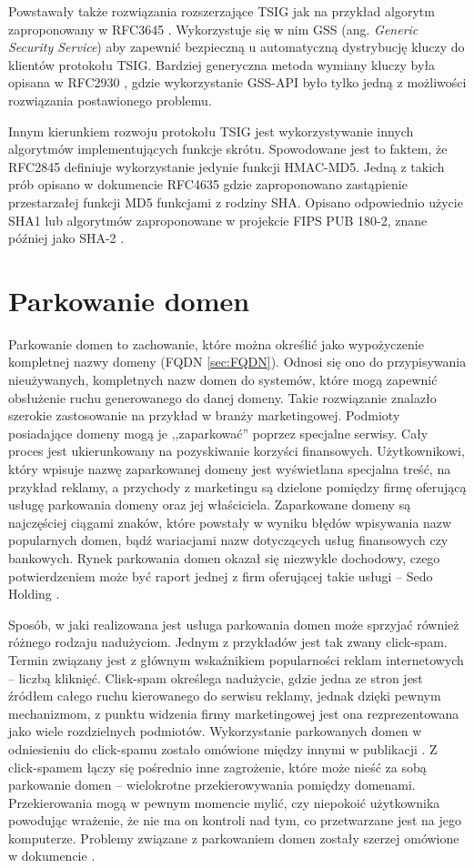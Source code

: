Powstawały także rozwiązania rozszerzające TSIG jak na przykład algorytm zaproponowany w RFC3645 \cite{RFC3645}. Wykorzystuje się
w nim GSS \cite{RFC2743}(ang. \textit{Generic Security Service}) aby zapewnić bezpieczną u automatyczną dystrybucję kluczy do
klientów protokołu TSIG. Bardziej generyczna metoda wymiany kluczy była opisana w RFC2930 \cite{RFC2930}, gdzie wykorzystanie
GSS-API było tylko jedną z możliwości rozwiązania postawionego problemu.

Innym kierunkiem rozwoju protokołu TSIG jest wykorzystywanie innych algorytmów implementujących funkcje skrótu. Spowodowane
jest to faktem, że RFC2845 \cite{RFC2845} definiuje wykorzystanie jedynie funkcji HMAC-MD5. Jedną z takich prób opisano w
dokumencie RFC4635 \cite{RFC4635} gdzie zaproponowano zastąpienie przestarzałej funkcji MD5 funkcjami z rodziny SHA. Opisano
odpowiednio użycie SHA1 \cite{RFC3174} lub algorytmów zaproponowane w projekcie FIPS PUB 180-2, znane później jako SHA-2 \cite{RFC4634}.

\section{Parkowanie domen}
Parkowanie domen to zachowanie, które można określić jako wypożyczenie kompletnej nazwy domeny (FQDN \ref{sec:FQDN}).
Odnosi się ono do przypisywania nieużywanych, kompletnych nazw domen do systemów, które mogą zapewnić obsłużenie ruchu generowanego
do danej domeny. Takie rozwiązanie znalazło szerokie zastosowanie na przykład w branży marketingowej. Podmioty posiadające domeny mogą
je ,,zaparkować'' poprzez specjalne serwisy. Cały proces jest ukierunkowany na pozyskiwanie korzyści finansowych. Użytkownikowi,
który wpisuje nazwę zaparkowanej domeny jest wyświetlana specjalna treść, na przykład reklamy, a przychody z marketingu są dzielone
pomiędzy firmę oferującą usługę parkowania domeny oraz jej właściciela. Zaparkowane domeny są najczęściej ciągami znaków, które
powstały w wyniku błędów wpisywania nazw popularnych domen, bądź wariacjami nazw dotyczących usług finansowych czy bankowych.
Rynek parkowania domen okazał się niezwykle dochodowy, czego potwierdzeniem może być raport jednej z firm oferującej
takie usługi -- Sedo Holding \cite{sedo}.

Sposób, w jaki realizowana jest usługa parkowania domen może sprzyjać również różnego rodzaju nadużyciom. Jednym z przykładów jest tak
zwany click-spam. Termin związany jest z głównym wskaźnikiem popularności reklam internetowych -- liczbą kliknięć. Clisk-spam określega
nadużycie, gdzie jedna ze stron jest źródłem całego ruchu kierowanego do serwisu reklamy, jednak dzięki pewnym mechanizmom, z punktu
widzenia firmy marketingowej jest ona rezprezentowana jako wiele rozdzielnych podmiotów. Wykorzystanie parkowanych domen w odniesieniu
do click-spamu zostało omówione między innymi w publikacji \cite{measuring-and-fingerprinting-click-spam-in-ad-networks}.
Z click-spamem łączy się pośrednio inne zagrożenie, które może nieść za sobą parkowanie domen -- wielokrotne przekierowywania
pomiędzy domenami. Przekierowania mogą w pewnym momencie mylić, czy niepokoić użytkownika powodując wrażenie, że nie ma on
kontroli nad tym, co przetwarzane jest na jego komputerze. Problemy związane z parkowaniem domen zostały szerzej omówione w
dokumencie \cite{domain_parking}.
